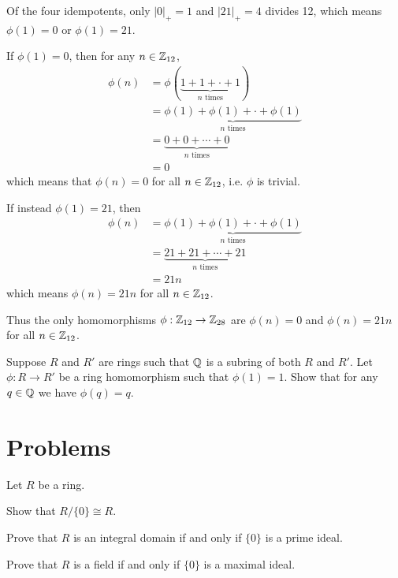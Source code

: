 \begin{example}
    Of the four idempotents, only $|0|_+ = 1$ and $|21|_+ = 4$ divides 12, which means $\phi(1) = 0$ or $\phi(1) = 21$.

    If $\phi(1) = 0$, then for any $n \in \mathbb{Z}_{12}$,
    \begin{align*}
        \phi(n) &= \phi(\underbrace{1 + 1 + \cdot + 1}_{n \text{ times}})\\
        &= \underbrace{\phi(1) + \phi(1) + \cdot + \phi(1)}_{n \text{ times}}\\
        &= \underbrace{0 + 0 + \cdots + 0}_{n \text{ times}}\\
        &= 0
    \end{align*}
    which means that $\phi(n) = 0$ for all $n \in \mathbb{Z}_{12}$, i.e. $\phi$ is trivial.

    If instead $\phi(1) = 21$, then
    \begin{align*}
        \phi(n) &= \underbrace{\phi(1) + \phi(1) + \cdot + \phi(1)}_{n \text{ times}}\\
        &= \underbrace{21 + 21 + \cdots + 21}_{n \text{ times}}\\
        &= 21n
    \end{align*}
    which means $\phi(n) = 21n$ for all $n \in \mathbb{Z}_{12}$.

    Thus the only homomorphisms $\phi: \mathbb{Z}_{12} \to \mathbb{Z}_{28}$ are $\phi(n) = 0$ and $\phi(n) = 21n$ for all $n \in \mathbb{Z}_{12}$.
\end{example}

\begin{exercise}\label{exercise-homomorphism-over-Q-fixes-elements-of-Q}
    Suppose $R$ and $R'$ are rings such that $\mathbb{Q}$ is a subring of both $R$ and $R'$. Let $\phi: R \to R'$ be a ring homomorphism such that $\phi(1) = 1$. Show that for any $q \in \mathbb{Q}$ we have $\phi(q) = q$.
\end{exercise}

\newpage

\section{Problems}
\begin{problem}\label{problem-integral-domain-iff-trivial-ideal-is-prime}
    Let $R$ be a ring.
    \begin{partquestions}{\roman*}
        \item Show that $R/\{0\} \cong R$.
        \item Prove that $R$ is an integral domain if and only if $\{0\}$ is a prime ideal.
        \item Prove that $R$ is a field if and only if $\{0\}$ is a maximal ideal.
    \end{partquestions}
\end{problem}

